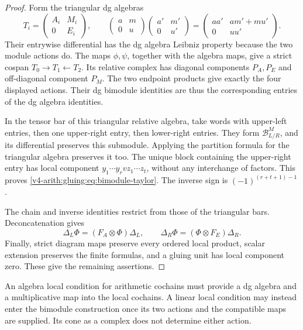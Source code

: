 \begin{proof}
Form the triangular dg algebras
\[
 T_i=\begin{pmatrix}A_i&M_i\\0&E_i\end{pmatrix},\qquad
 \begin{pmatrix}a&m\\0&u\end{pmatrix}
 \begin{pmatrix}a'&m'\\0&u'\end{pmatrix}
 =\begin{pmatrix}aa'&am'+mu'\\0&uu'\end{pmatrix}.
\]
Their entrywise differential has the dg algebra Leibniz property
because the two module actions do. The maps \(\phi,\psi\), together
with the algebra maps, give a strict cospan \(T_0\to T_1\leftarrow T_2\).
Its relative complex has diagonal components \(P_A,P_E\) and
off-diagonal component \(P_M\). The two endpoint products give
exactly the four displayed actions. Their dg bimodule identities
are thus the corresponding entries of the dg algebra identities.

In the tensor bar of this triangular relative algebra, take words
with upper-left entries, then one upper-right entry, then lower-right
entries. They form \(\mathcal B^M_{L/R}\), and its differential
preserves this submodule. Applying the partition formula for the
triangular algebra preserves it too. The unique block containing
the upper-right entry has local component
\(y_1\cdots y_r v z_1\cdots z_t\), without any interchange of
factors. This proves \eqref{v4-arith:gluing:eq:bimodule-taylor}.
The inverse sign is \((-1)^{(r+t+1)-1}\).

The chain and inverse identities restrict from those of the
triangular bars. Deconcatenation gives
\[
 \Delta_L\Phi=(F_A\otimes\Phi)\Delta_L,
 \qquad\Delta_R\Phi=(\Phi\otimes F_E)\Delta_R.
\]
Finally, strict diagram maps preserve every ordered local product,
scalar extension preserves the finite formulas, and a gluing unit
has local component zero. These give the remaining assertions.
\end{proof}

An algebra local condition for arithmetic cochains must provide a dg
algebra and a multiplicative map into the local cochains. A linear local
condition may instead enter the bimodule construction once its two
actions and the compatible maps are supplied. Its cone as a complex
does not determine either action.

